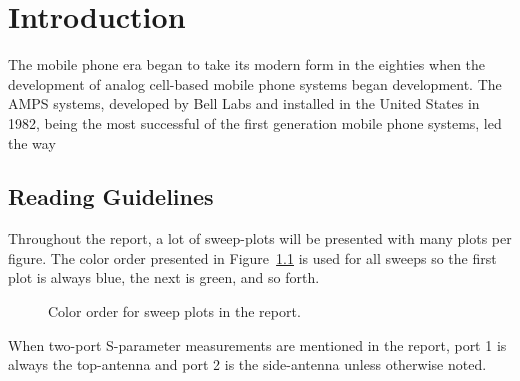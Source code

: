 \chapter{Introduction}
\label{cha:intro}

The mobile phone era began to take its modern form in the eighties when the development of analog cell-based mobile phone systems began development. The AMPS systems, developed by Bell Labs and installed in the United States in 1982, being the most successful of the first generation mobile phone systems, led the way










\section{Reading Guidelines}
Throughout the report, a lot of sweep-plots will be presented with many plots per figure. The color order presented in Figure~\ref{fig:colororder} is used for all sweeps so the first plot is always blue, the next is green, and so forth.

\begin{figure}[htbp]
    \centering
    \caption{Color order for sweep plots in the report.}
    \label{fig:colororder}
\end{figure}

When two-port S-parameter measurements are mentioned in the report, port 1 is always the top-antenna and port 2 is the side-antenna unless otherwise noted.

